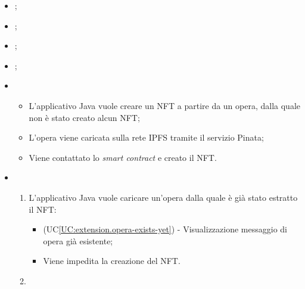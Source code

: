 \begin{itemize}
  \item {};
  \item {};
  \item {};
  \item {};
  \item \UCMain{}
  \begin{itemize}
    \item L'applicativo Java vuole creare un NFT a partire da un opera, dalla quale non è stato creato alcun NFT;
    \item L'opera viene caricata sulla rete IPFS tramite il servizio Pinata;
    \item Viene contattato lo \textit{smart contract} e creato il NFT.
  \end{itemize}
  \item \UCExt{}
  \begin{enumerate}[label=\lett]
    \item L'applicativo Java vuole caricare un'opera dalla quale è già stato estratto il NFT:
    \begin{itemize}
      \item (UC\ref{UC:extension.opera-exists-yet}) - Visualizzazione messaggio di opera già esistente;
      \item Viene impedita la creazione del NFT.
    \end{itemize}
    
    \item 
  \end{enumerate}
\end{itemize}






\label{UC:extension.operation-not-allowed}

\label{UC:extension.opera-exists-yet}



